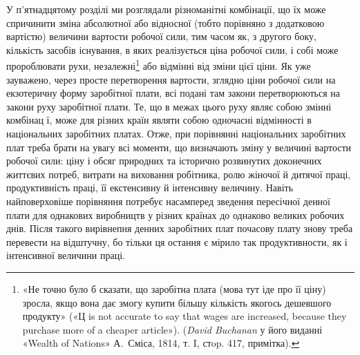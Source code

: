 У п’ятнадцятому розділі ми розглядали різноманітні комбінації,
що їх може спричинити зміна абсолютної або відносної
(тобто порівняно з додатковою вартістю) величини вартости робочої
сили, тим часом як, з другого боку, кількість засобів існування,
в яких реалізується ціна робочої сили, і собі може пророблювати
рухи, незалежні\footnote{
«Не точно було б сказати, що заробітна плата (мова тут іде про
її ціну) зросла, якщо вона дає змогу купити більшу кількість якогось
дешевшого продукту» («Ц is not accurate to say that wages are increased,
because they purchase more of a cheaper article»). (\emph{David Buchanan}
у його виданні «Wealth of Nations» А.~Сміса, 1814, т. I, стop. 417,
примітка).
} або відмінні від зміни цієї ціни. Як уже зауважено,
через просте перетворення вартости, зглядно ціни робочої
сили на екзотеричну форму заробітної плати, всі подані там
закони перетворюються на закони руху заробітної плати. Те,
що в межах цього руху являє собою змінні комбінац ї, може для
різних країн являти собою одночасні відмінності в національних
заробітних платах. Отже, при порівнянні національних заробітних
плат треба брати на увагу всі моменти, що визначають зміну
у величині вартости робочої сили: ціну і обсяг природних та
історично розвинутих доконечних життєвих потреб, витрати
на виховання робітника, ролю жіночої й дитячої праці, продуктивність
праці, її екстенсивну й інтенсивну величину. Навіть
найповерховіше порівняння потребує насамперед зведення пересічної
денної плати для однакових виробництв у різних країнах
до однаково великих робочих днів. Після такого вирівнепня денних
заробітних плат почасову плату знову треба перевести на
відштучну, бо тільки ця остання є мірило так продуктивности,
як і інтенсивної величини праці.
